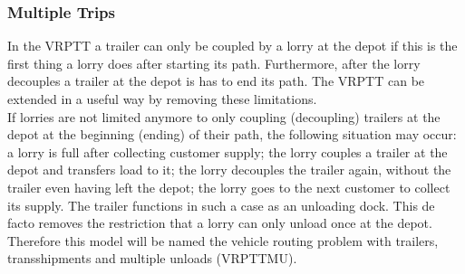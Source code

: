 \subsubsection{Multiple Trips}
In the VRPTT a trailer can only be coupled by a lorry at the depot if this is the first thing a lorry does after starting its path.
Furthermore, after the lorry decouples a trailer at the depot is has to end its path.
The VRPTT can be extended in a useful way by removing these limitations. \\


%
%

%

If lorries are not limited anymore to only coupling (decoupling) trailers at the depot at the beginning (ending) of their path, the following situation may occur:
a lorry is full after collecting customer supply;
 the lorry couples a trailer at the depot and transfers load to it; the lorry decouples the trailer again, without the trailer even having left the depot; the lorry goes to the next customer to collect its supply.
The trailer functions in such a case as an unloading dock.
This de facto removes the restriction that a lorry can only unload once at the depot.
Therefore this model will be named the vehicle routing problem with trailers, transshipments and multiple unloads (VRPTTMU). \\

